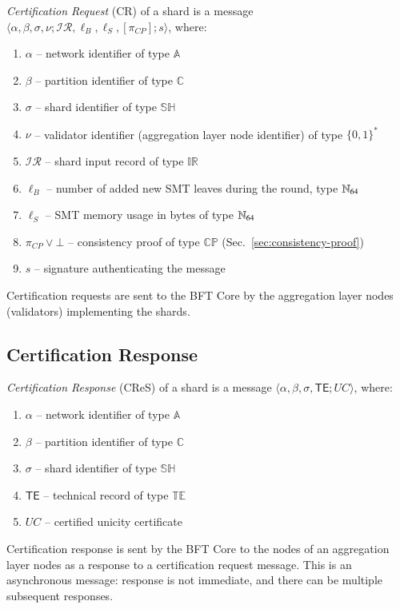 \emph{Certification Request} (CR) of a shard is a message $\langle \alpha, \beta, \sigma, \nu; \mathcal{IR}, \ell_B, \ell_S, [\pi_{CP}]; s \rangle$, where:
\begin{enumerate}
	\item $\alpha$ -- network identifier of type $\mathbb{A}$
	\item $\beta$ -- partition identifier of type $\mathbb{C}$
	\item $\sigma$ -- shard identifier of type $\mathbb{SH}$
	\item $\nu$ -- validator identifier (aggregation layer node identifier) of type $\{0,1\}^\ast$
	\item $\mathcal{IR}$ -- shard input record of type $\mathbb{IR}$
	\item $\ell_B$ -- number of added new SMT leaves during the round, type $\mathbb{N}_{64}$
	\item $\ell_S$ -- SMT memory usage in bytes of type $\mathbb{N}_{64}$
	\item $\pi_{CP} \lor \bot$ -- consistency proof of type $\mathbb{CP}$ (Sec.~\ref{sec:consistency-proof})
	\item $s$ -- signature authenticating the message
\end{enumerate}

Certification requests are sent to the BFT Core by the aggregation layer nodes (validators) implementing the shards.

\subsection{Certification Response}\label{certification-response}

\emph{Certification Response} (CReS) of a shard is a message $\langle \alpha, \beta, \sigma, \mathsf{TE}; UC \rangle$, where:
\begin{enumerate}
	\item $\alpha$ -- network identifier of type $\mathbb{A}$
	\item $\beta$ -- partition identifier of type $\mathbb{C}$
	\item $\sigma$ -- shard identifier of type $\mathbb{SH}$
	\item $\mathsf{TE}$ -- technical record of type $\mathbb{TE}$
	\item $UC$ -- certified unicity certificate
\end{enumerate}

Certification response is sent by the BFT Core to the nodes of an aggregation layer nodes as a response to a certification request message. This is an asynchronous message: response is not immediate, and there can be multiple subsequent responses.

